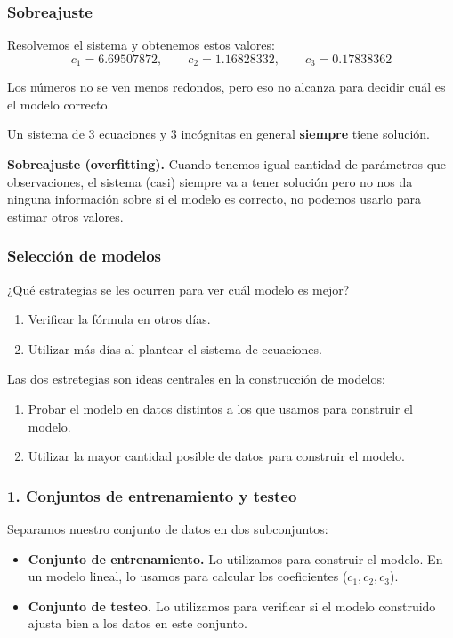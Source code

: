 \documentclass[aspectratio=169,12pt]{beamer}
\begin{document}
\begin{frame}
\frametitle{Sobreajuste}

Resolvemos el sistema y obtenemos estos valores:
$$c_1 = 6.69507872, \quad \quad c_2 = 1.16828332, \quad \quad c_3 = 0.17838362$$

Los números no se ven menos redondos, pero eso no alcanza para decidir cuál es el modelo correcto.

Un sistema de 3 ecuaciones y 3 incógnitas en general \textbf{siempre} tiene solución.

\textbf{Sobreajuste (overfitting).} Cuando tenemos igual cantidad de parámetros que observaciones, el sistema (casi) siempre va a tener solución pero no nos da ninguna información sobre si el modelo es correcto, no podemos usarlo para estimar otros valores.

\end{frame}



\begin{frame}
\frametitle{Selección de modelos}

¿Qué estrategias se les ocurren para ver cuál modelo es mejor? \pause

\begin{enumerate}
\item Verificar la fórmula en otros días. \pause
\item Utilizar más días al plantear el sistema de ecuaciones.
\end{enumerate}

\pause

Las dos estretegias son ideas centrales en la construcción de modelos:
\begin{enumerate}
\item Probar el modelo en datos distintos a los que usamos para construir el modelo.
\item Utilizar la mayor cantidad posible de datos para construir el modelo.
\end{enumerate}

\end{frame}



\begin{frame}
\frametitle{1. Conjuntos de entrenamiento y testeo}

Separamos nuestro conjunto de datos en dos subconjuntos:
\begin{itemize}
\item \textbf{Conjunto de entrenamiento.} Lo utilizamos para construir el modelo. En un modelo lineal, lo usamos para calcular los coeficientes ($c_1, c_2, c_3$).
\item \textbf{Conjunto de testeo.} Lo utilizamos para verificar si el modelo construido ajusta bien a los datos en este conjunto.
\end{itemize}

\end{frame}
\end{document}
